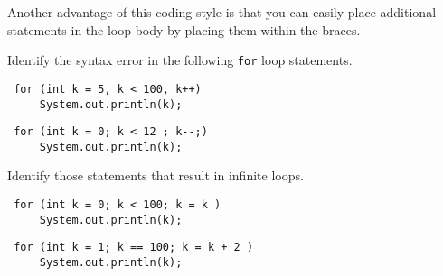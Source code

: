 \noindent Another advantage of this coding style is that you
can easily place additional statements in the loop body by placing
them within the braces.


\begin{SSTUDY}
\item  Identify the syntax error in the following {\tt for} loop \mbox{statements.}
\begin{EXRLL}
\item 

\begin{jjjlisting}
\begin{lstlisting}
 for (int k = 5, k < 100, k++)
     System.out.println(k);
\end{lstlisting}
\end{jjjlisting}

\item 

\begin{jjjlisting}
\begin{lstlisting}
 for (int k = 0; k < 12 ; k--;)
     System.out.println(k);
\end{lstlisting}
\end{jjjlisting}

\end{EXRLL}

\item  Identify those statements that result in infinite loops.
\begin{EXRLL}
\item 

\begin{jjjlisting}
\begin{lstlisting}
 for (int k = 0; k < 100; k = k )
     System.out.println(k);
\end{lstlisting}
\end{jjjlisting}


\item 

\begin{jjjlisting}
\begin{lstlisting}
 for (int k = 1; k == 100; k = k + 2 )
     System.out.println(k);
\end{lstlisting}
\end{jjjlisting}



\end{EXRLL}
\end{SSTUDY}
